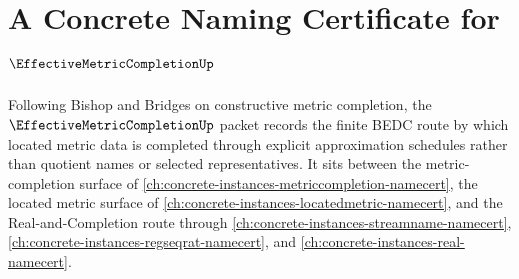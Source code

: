 \chapter{A Concrete Naming Certificate for $\EffectiveMetricCompletionUp$}
\label{ch:concrete-instances-effective-metric-completion-namecert}

Following Bishop and Bridges on constructive metric completion, the $\EffectiveMetricCompletionUp$ packet records the finite BEDC route by which located metric data is completed through explicit approximation schedules rather than quotient names or selected representatives. It sits between the metric-completion surface of \autoref{ch:concrete-instances-metriccompletion-namecert}, the located metric surface of \autoref{ch:concrete-instances-locatedmetric-namecert}, and the Real-and-Completion route through \autoref{ch:concrete-instances-streamname-namecert}, \autoref{ch:concrete-instances-regseqrat-namecert}, and \autoref{ch:concrete-instances-real-namecert}.


